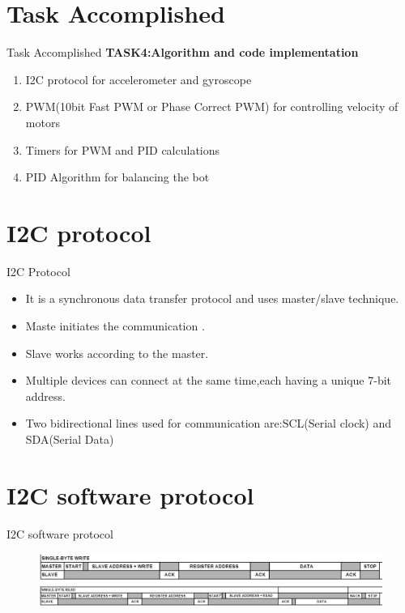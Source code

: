 \documentclass[10pt, a4paper]{beamer}
\begin{document}
\section{Task Accomplished}
\begin{frame}{Task Accomplished}
	\textbf{TASK4:Algorithm and code implementation}
	\begin{enumerate}
		\item I2C protocol for accelerometer and gyroscope
		\item PWM(10bit Fast PWM or Phase Correct PWM) for controlling velocity of motors 
		\item Timers for PWM and PID calculations
		\item PID Algorithm for balancing the bot 
	\end{enumerate}
\end{frame}


\section{I2C protocol}
\begin{frame}{I2C Protocol}
	\begin{itemize}
		\item It is a synchronous data transfer protocol and uses master/slave technique.
		\item Maste initiates the communication .
		\item Slave works according to the master.
		\item Multiple devices can connect at the same time,each having a unique 7-bit address.
		\item Two bidirectional lines used for communication are:SCL(Serial clock) and SDA(Serial Data) 
	\end{itemize}
\end{frame}


\section{I2C software protocol}
\begin{frame}{I2C software protocol}
	\begin{figure}
		\includegraphics[scale=0.35]{I2C_write.jpg}\\
		\includegraphics[scale=0.33]{I2C_read.jpg}
	\end{figure}
\end{frame}
\end{document}

